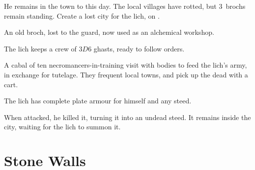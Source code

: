 \begin{multicols}{2}
\begin{dlist}
  He remains in the town to this day.
  The local \glspl{village} have rotted, but 3~\glspl{broch} remain standing.
  Create a lost city for the \gls{lich}, on .
  \item
  An old \gls{broch}, lost to the \gls{guard}, now used as an alchemical workshop.
  \item
  The \gls{lich} keeps a crew of $3D6$ ghasts, ready to follow orders.
  \item
  A cabal of ten necromancers-in-training visit with bodies to feed the \gls{lich}'s army, in exchange for tutelage.
  They frequent local towns, and pick up the dead with a cart.
  \item
  The \gls{lich} has complete plate armour for himself and any steed.
  \item
  When  attacked, he killed it, turning it into an undead steed.
  It remains inside the city, waiting for the \gls{lich} to summon it.
\end{dlist}

\end{multicols}

\section{Stone Walls}
\label{mapStrangePlaces}

